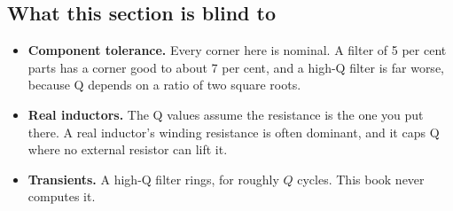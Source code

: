 \subsection{What this section is blind to}
\label{c3:sec:a6}
\begin{itemize}
  \item \textbf{Component tolerance.} Every corner here is nominal. A filter of 5 per cent parts has a corner good to about 7 per cent, and a high-Q filter is far worse, because Q depends on a ratio of two square roots.
  \item \textbf{Real inductors.} The Q values assume the resistance is the one you put there. A real inductor's winding resistance is often dominant, and it caps Q where no external resistor can lift it.
  \item \textbf{Transients.} A high-Q filter rings, for roughly $Q$ cycles. This book never computes it.
\end{itemize}

